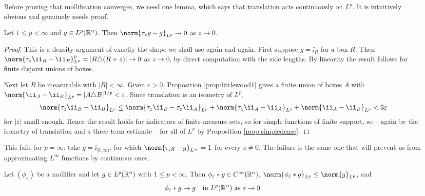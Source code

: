 \documentclass[a4paper]{scrartcl}
\begin{document}
Before proving that mollification converges, we need one lemma, which says that translation acts continuously on $L^p$. It is intuitively obvious and genuinely needs proof.

\begin{lemma}\label{lem:transcont}
	Let $1 \le p < \infty$ and $g \in L^p(\mathbb{R}^n)$. Then $\norm{\tau_z g - g}_{L^p} \to 0$ as $z \to 0$.
\end{lemma}

\begin{proof}
	This is a density argument of exactly the shape we shall use again and again. First suppose $g = \ii_R$ for a box $R$. Then $\norm{\tau_z \ii_R - \ii_R}_{L^p}^p = |R \triangle (R + z)| \to 0$ as $z \to 0$, by direct computation with the side lengths. By linearity the result follows for finite disjoint unions of boxes.

	Next let $B$ be measurable with $|B| < \infty$. Given $\varepsilon > 0$, Proposition \ref{prop:littlewood1} gives a finite union of boxes $A$ with $\norm{\ii_A - \ii_B}_{L^p} = |A \triangle B|^{1/p}< \varepsilon$. Since translation is an isometry of $L^p$,
	$$\norm{\tau_z \ii_B - \ii_B}_{L^p} \le \norm{\tau_z \ii_B - \tau_z \ii_A}_{L^p} + \norm{\tau_z \ii_A - \ii_A}_{L^p} + \norm{\ii_A - \ii_B}_{L^p} < 3\varepsilon$$
	for $|z|$ small enough. Hence the result holds for indicators of finite-measure sets, so for simple functions of finite support, so -- again by the isometry of translation and a three-term estimate -- for all of $L^p$ by Proposition \ref{prop:simpledense}.
\end{proof}

\begin{remark}
	This fails for $p = \infty$: take $g = \ii_{[0,\infty)}$, for which $\norm{\tau_z g - g}_{L^\infty} = 1$ for every $z \ne 0$. The failure is the same one that will prevent us from approximating $L^\infty$ functions by continuous ones.
\end{remark}

\begin{theorem}[Mollification]\label{thm:mollify}
	Let $(\phi_\varepsilon)$ be a mollifier and let $g \in L^p(\mathbb{R}^n)$ with $1 \le p < \infty$. Then $\phi_\varepsilon * g \in C^\infty(\mathbb{R}^n)$, $\norm{\phi_\varepsilon * g}_{L^p} \le \norm{g}_{L^p}$, and
	$$\phi_\varepsilon * g \to g \quad \text{in } L^p(\mathbb{R}^n) \text{ as } \varepsilon \to 0.$$
\end{theorem}
\end{document}

